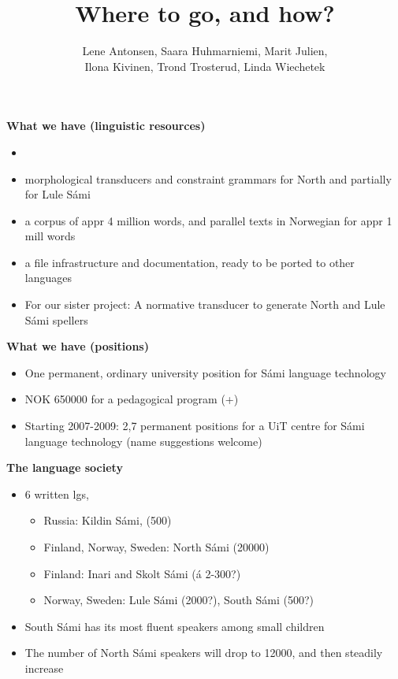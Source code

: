 \documentclass[landscape,english,11pt]{seminar}
\title{Where to go, and how?}
\author{Lene Antonsen, 
Saara Huhmarniemi, 
Marit Julien, \\
Ilona Kivinen, 
Trond Trosterud, 
Linda Wiechetek}
\begin{document}
\begin{slide}

\maketitle


\newslide
\textbf{What we have (linguistic resources)}
\begin{itemize}
\item 
\item morphological transducers and constraint grammars for North and partially for Lule Sámi
\item a corpus of appr 4 million words, and parallel texts in Norwegian for appr 1 mill words
\item a file infrastructure and documentation, ready to be ported to other languages
\item For our sister project: A normative transducer to generate North and Lule Sámi spellers
\end{itemize}

\newslide
\textbf{What we have (positions)}
\begin{itemize}
\item One permanent, ordinary university position for Sámi language technology 
\item NOK 650000 for a pedagogical program (+)
\item Starting 2007-2009: 2,7 permanent positions for a UiT centre for Sámi language technology (name suggestions welcome)
\end{itemize}


\newslide
\textbf{The language society}
\begin{itemize}
\item 6 written lgs, 
\begin{itemize}
\item Russia: Kildin Sámi, (500)
\item Finland, Norway, Sweden: North Sámi (20000)
\item Finland: Inari and Skolt Sámi (á 2-300?)
\item Norway, Sweden: Lule Sámi (2000?), South Sámi (500?)
\end{itemize}
\item South Sámi has its most fluent speakers among small children
\item The number of North Sámi speakers will drop to 12000, and then steadily increase
\end{itemize}


\end{slide}
\end{document}
